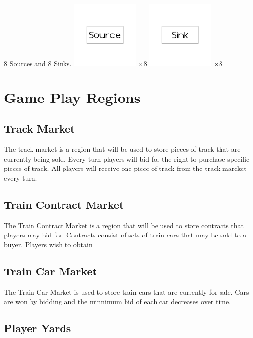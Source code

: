 \documentclass[12pt, letterpaper]{article}
\begin{document}
8 Sources and 8 Sinks.
\includegraphics[width=0.25\textwidth]{Source.png} $\times 8$
\includegraphics[width=0.25\textwidth]{Sink.png} $\times 8$


\section{Game Play Regions}

\subsection{Track Market}
The track market is a region that will be used to store pieces of track that are currently being sold. Every turn players will bid for the right to purchase specific pieces of track. All players will receive one piece of track from the track marcket every turn.

\subsection{Train Contract Market}

The Train Contract Market is a region that will be used to store contracts that players may bid for. Contracts consist of sets of train cars that may be sold to a buyer. Players wish to obtain

\subsection{Train Car Market}

The Train Car Market is used to store train cars that are currently for sale. Cars are won by bidding and the minnimum bid of each car decreases over time.

\subsection{Player Yards}
\end{document}
